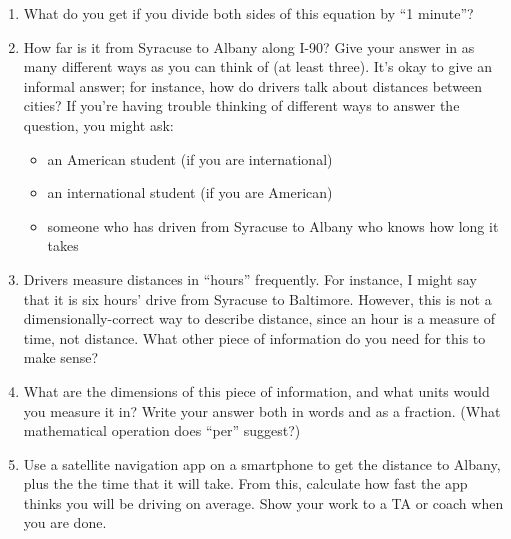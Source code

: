 \documentclass[12pt]{article}
\newcommand{\BI}{\begin{itemize}}
\newcommand{\EI}{\end{itemize}}
\begin{document}
\begin{enumerate}


\item What do you get if you divide both sides of this equation by ``1 minute''?



\vspace{1in}

\item How far is it from Syracuse to Albany along I-90? Give your answer in as many different ways as you can think of
(at least three). It's okay to give an informal answer; for instance, how do drivers talk about distances between cities?
If you're having trouble thinking of different ways to answer the question, you might ask:

\BI
\item an American student (if you are international)
\item an international student (if you are American)
\item someone who has driven from Syracuse to Albany who knows how long it takes
\EI

\vspace{3in}


\newpage

\item Drivers measure distances in ``hours'' frequently. For instance, I might say that it is six hours' drive 
from Syracuse to Baltimore. However, this is not a dimensionally-correct way to describe distance, since an hour
is a measure of time, not distance. What other piece of information do you need for this to make sense?

\vspace{2in}

\item What are the dimensions of this piece of information, and what units would you measure it in? Write your answer both in
words and as a fraction. (What mathematical operation does ``per'' suggest?)

\vspace{1in}


\item Use a satellite navigation app on a smartphone to get the distance to Albany, plus the the time that it will take.
From this, calculate how fast the app thinks you will be driving on average. Show your work to a TA or coach when you are done.

\vspace{2in}


\end{enumerate}
\end{document}
